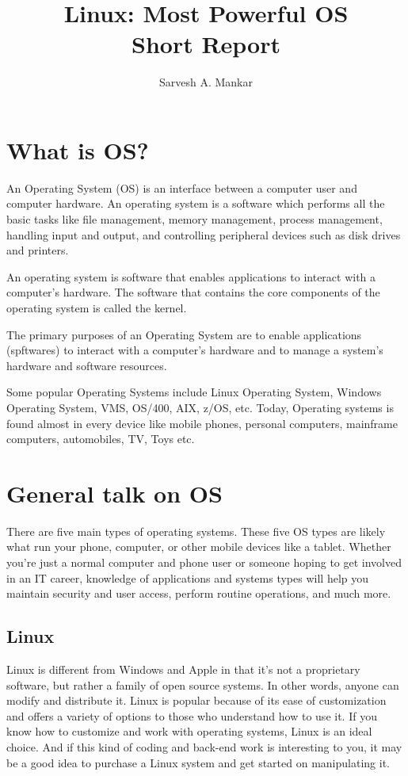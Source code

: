 \documentclass[12pt]{article}
\title{Linux: Most Powerful OS \\ Short Report}
\author{Sarvesh A. Mankar}
\begin{document}
\maketitle
\thispagestyle{empty}
\tableofcontents 


\section{What is OS?}
An Operating System (OS) is an interface between a computer user and computer hardware. An operating system is a software which performs all the basic tasks like file management, memory management, process management, handling input and output, and controlling peripheral devices such as disk drives and printers.

An operating system is software that enables applications to interact with a computer's hardware. The software that contains the core components of the operating system is called the kernel.

The primary purposes of an Operating System are to enable applications (spftwares) to interact with a computer's hardware and to manage a system's hardware and software resources.

Some popular Operating Systems include Linux Operating System, Windows Operating System, VMS, OS/400, AIX, z/OS, etc. Today, Operating systems is found almost in every device like mobile phones, personal computers, mainframe computers, automobiles, TV, Toys etc. ~\cite{[1]}

\section{General talk on OS}

There are five main types of operating systems. These five OS types are likely what run your phone, computer, or other mobile devices like a tablet. Whether you’re just a normal computer and phone user or someone hoping to get involved in an IT career, knowledge of applications and systems types will help you maintain security and user access, perform routine operations, and much more. ~\cite{[2]}

\subsection{Linux}
Linux is different from Windows and Apple in that it’s not a proprietary software, but rather a family of open source systems. In other words, anyone can modify and distribute it. Linux is popular because of its ease of customization and offers a variety of options to those who understand how to use it. If you know how to customize and work with operating systems, Linux is an ideal choice. And if this kind of coding and back-end work is interesting to you, it may be a good idea to purchase a Linux system and get started on manipulating it. ~\cite{[2]}
\end{document}

